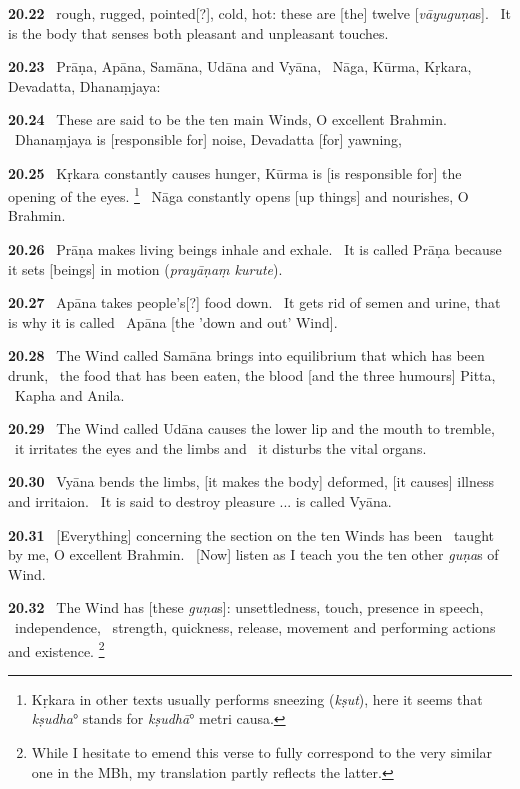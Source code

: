 \documentclass{article}
\newcommand{\skt}[1]{\textit{#1}}
\begin{document}
\textbf{20.22}%
\ rough, rugged, pointed[?], cold, hot: these are [the] twelve [\skt{vāyuguṇa}s].%
\ It is the body that senses both pleasant and unpleasant touches.%


\textbf{20.23}%
\ Prāṇa, Apāna, Samāna, Udāna and Vyāna,%
\ Nāga, Kūrma, Kṛkara, Devadatta, Dhanaṃjaya:%


\textbf{20.24}%
\ These are said to be the ten main Winds, O excellent Brahmin.%
\ Dhanaṃjaya is [responsible for] noise, Devadatta [for] yawning,%


\textbf{20.25}%
\ Kṛkara constantly causes hunger, Kūrma is [is responsible for] the opening of the eyes.%
\footnote{Kṛkara in other texts usually performs sneezing (\skt{kṣut}), here                it seems that \skt{kṣudha}° stands for \skt{kṣudhā}° metri causa. }%
\ Nāga constantly opens [up things] and nourishes, O Brahmin.%


\textbf{20.26}%
\ Prāṇa makes living beings inhale and exhale.%
\ It is called Prāṇa because it sets [beings] in motion (\skt{prayāṇaṃ kurute}).%


\textbf{20.27}%
\ Apāna takes people's[?] food down.%
\ It gets rid of semen and urine, that is why it is called%
\                         Apāna [the 'down and out' Wind].%


\textbf{20.28}%
\ The Wind called Samāna brings into equilibrium that which has been drunk,%
\                 the food that has been eaten, the blood [and the three humours] Pitta,%
\                         Kapha and Anila.%


\textbf{20.29}%
\ The Wind called Udāna causes the lower lip and the mouth to tremble,%
\                  it irritates the eyes and the limbs and%
\                  it disturbs the vital organs.%


\textbf{20.30}%
\ Vyāna bends the limbs, [it makes the body] deformed, [it causes] illness and irritaion.%
\ It is said to destroy pleasure ... is called Vyāna.%


\textbf{20.31}%
\ [Everything] concerning the section on the ten Winds has been%
\                         taught by me, O excellent Brahmin.%
\ [Now] listen as I teach you the ten other \skt{guṇa}s of Wind.%


\textbf{20.32}%
\ The Wind has [these \skt{guṇa}s]: unsettledness, touch, presence in speech,%
\                         independence,%
\ strength, quickness, release, movement and performing actions and existence.%
\footnote{While I hesitate to emend this verse to fully correspond to the                         very similar one in the MBh, my translation partly reflects the                        latter. }%
\end{document}
